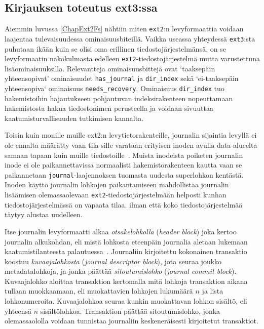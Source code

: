 %

\subsection{Kirjauksen toteutus ext3:ssa}
Aiemmin luvussa \ref{ChapExt2Fs} nähtiin miten \texttt{ext2}:n levyformaattia voidaan laajentaa tulevaisuudessa ominaisuusbiteillä.
Vaikka useassa yhteydessä \texttt{ext3}:sta puhutaan ikään kuin se olisi oma erillinen tiedostojärjestelmänsä,
on se levyformaatin näkökulmasta edelleen \texttt{ext2}-tiedostojärjestelmä mutta varustettuna lisäominaisuuksilla.
Relevantteja ominaisuusbittejä ovat `taaksepäin yhteensopivat' ominaisuudet \texttt{has\_journal} ja \texttt{dir\_index} sekä `ei-taaksepäin yhteensopiva` ominaisuus \texttt{needs\_recovery}.
Ominaisuus \texttt{dir\_index} tuo hakemistoihin hajautukseen pohjautuvan indeksirakenteen nopeuttamaan hakemistosta hakua tiedostonimen perusteella ja voidaan sivuuttaa kaatumisturvallisuuden tutkimisen kannalta.

Toisin kuin monille muille ext2:n levytietorakenteille, journalin sijaintia levyllä ei ole ennalta määrätty vaan tila sille varataan erityisen inoden avulla data-alueelta samaan tapaan kuin muille tiedostoille~\cite{Ext2Journal}.
Muista inodeista poiketen journalin inode ei ole paikannettavissa normaalisti hakemistorakenteen kautta vaan se paikannetaan \texttt{journal}-laajennoksen tuomasta uudesta superlohkon kentästä.
Inoden käyttö journalin lohkojen paikantamiseen mahdollistaa journalin lisäämisen olemassaolevaan \texttt{ext2}-tiedostojärjestelmään helposti kunhan tiedostojärjestelmässä on vapaata tilaa.
ilman että koko tiedostojärjestelmää täytyy alustaa uudelleen.

Itse journalin levyformaatti alkaa \emph{otsakelohkolla} (\emph{header block}) joka kertoo journalin alkukohdan,
eli mistä lohkosta eteenpäin journalia aletaan lukemaan kaatumistilanteesta palautuessa~\cite{JournalingAnalysis}.
Journaliin kirjoitettu kokonainen transaktio koostuu \emph{kuvaajalohkosta} (\emph{journal descriptor block}),
jota seuraa joukko metadatalohkoja,
ja jonka päättää \emph{sitoutumislohko} (\emph{journal commit block}).
Kuvaajalohko aloittaa transaktion kertomalla mitä lohkoja transaktion aikana tullaan muokkaamaan,
eli muokattavien lohkojen lukumäärä $n$ ja lista lohkonumeroita.
Kuvaajalohkoa seuraa kunkin muokattavan lohkon sisältö, eli yhteensä $n$ sisältölohkoa.
Transaktion päättää sitoutumislohko,
jonka olemassaololla voidaan tunnistaa journaliin keskeneräisesti kirjoitetut transaktiot.

